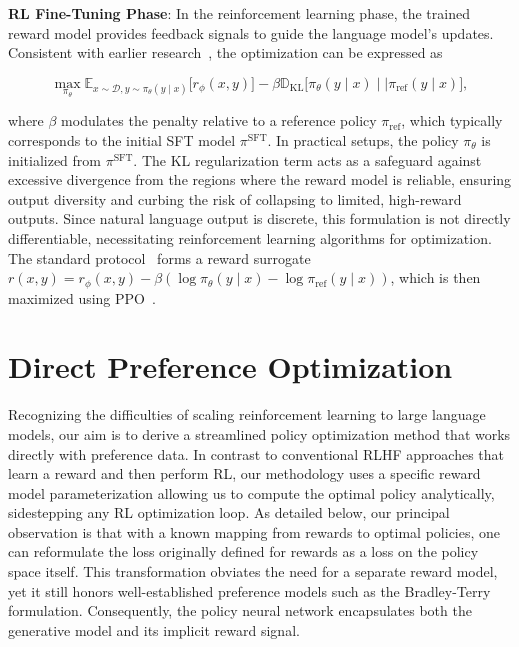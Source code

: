 \textbf{RL Fine-Tuning Phase}: In the reinforcement learning phase, the trained reward model provides feedback signals to guide the language model's updates. Consistent with earlier research~\citep{jaques2017sequence, jaques2020human}, the optimization can be expressed as

\begin{equation}\label{eq:RL}
\max_{\pi_{\theta}}  \mathbb{E}_{x\sim \mathcal{D}, y\sim \pi_{\theta}(y \mid x)}\bigl[r_{\phi}(x, y)\bigr] - \beta\mathbb{D}_{\textrm{KL}}\bigl[\pi_{\theta}(y\mid x)\mid \mid \pi_\text{ref}(y\mid x)\bigr],
\end{equation}

where $\beta$ modulates the penalty relative to a reference policy $\pi_\text{ref}$, which typically corresponds to the initial SFT model $\pi^\text{SFT}$. 
In practical setups, the policy $\pi_\theta$ is initialized from $\pi^\text{SFT}$. The KL regularization term acts as a safeguard against excessive divergence from the regions where the reward model is reliable, ensuring output diversity and curbing the risk of collapsing to limited, high-reward outputs. Since natural language output is discrete, this formulation is not directly differentiable, necessitating reinforcement learning algorithms for optimization. The standard protocol~\citep{ziegler2020finetuning, stiennon2022learning, bai2022training, ouyang2022training} forms a reward surrogate ${r(x, y) = r_{\phi}(x, y) -\beta (\log \pi_{\theta}(y\mid x) - \log \pi_\text{ref}(y\mid x))}$, which is then maximized using PPO~\cite{schulman2017proximal}.

\section{Direct Preference Optimization}\label{sec:DPO}

Recognizing the difficulties of scaling reinforcement learning to large language models, our aim is to derive a streamlined policy optimization method that works directly with preference data. In contrast to conventional RLHF approaches that learn a reward and then perform RL, our methodology uses a specific reward model parameterization allowing us to compute the optimal policy analytically, sidestepping any RL optimization loop. As detailed below, our principal observation is that with a known mapping from rewards to optimal policies, one can reformulate the loss originally defined for rewards as a loss on the policy space itself. This transformation obviates the need for a separate reward model, yet it still honors well-established preference models such as the Bradley-Terry formulation. Consequently, the policy neural network encapsulates both the generative model and its implicit reward signal.

